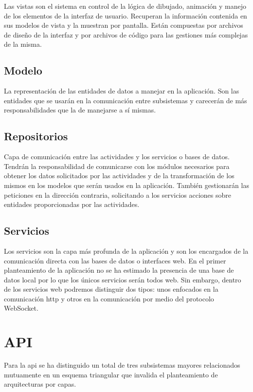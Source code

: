 Las vistas son el sistema en control de la lógica de dibujado, animación y manejo de los elementos de la interfaz de usuario. Recuperan la información contenida en sus modelos de vista y la muestran por pantalla. Están compuestas por archivos de diseño de la interfaz y por archivos de código para las gestiones más complejas de la misma.

\subsection{Modelo}

La representación de las entidades de datos a manejar en la aplicación. Son las entidades que se usarán en la comunicación entre subsistemas y carecerán de más responsabilidades que la de manejarse a sí mismas.

\subsection{Repositorios}

Capa de comunicación entre las actividades y los servicios o bases de datos. Tendrán la responsabilidad de comunicarse con los módulos necesarios para obtener los datos solicitados por las actividades y de la transformación de los mismos en los modelos que serán usados en la aplicación. También gestionarán las peticiones en la dirección contraria, solicitando a los servicios acciones sobre entidades proporcionadas por las actividades.

\subsection{Servicios}

Los servicios son la capa más profunda de la aplicación y son los encargados de la comunicación directa con las bases de datos o interfaces web. En el primer planteamiento de la aplicación no se ha estimado la presencia de una base de datos local por lo que los únicos servicios serán todos web. Sin embargo, dentro de los servicios web podremos distinguir dos tipos: unos enfocados en la comunicación \acrshort{http} y otros en la comunicación por medio del protocolo WebSocket.

\section{API}

Para la \acrshort{api} se ha distinguido un total de tres subsistemas mayores relacionados mutuamente en un esquema triangular que invalida el planteamiento de arquitecturas por capas.

